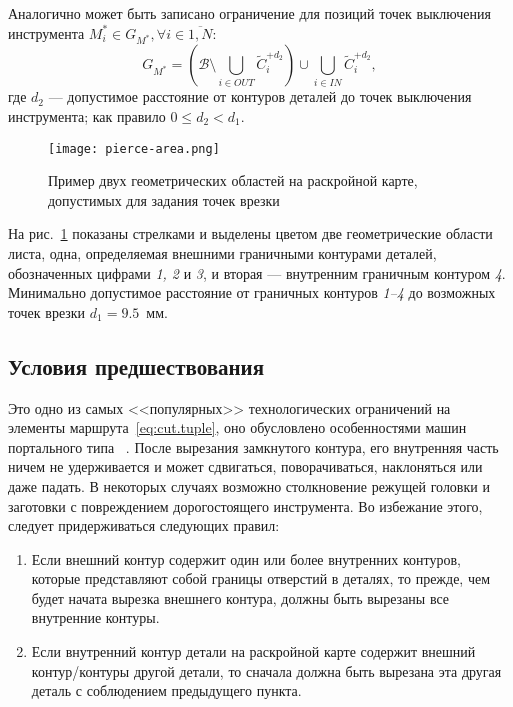 Аналогично может быть записано ограничение для
позиций точек выключения инструмента
$M^*_i \in G_{M^*}, \forall i \in \overline{1, N}$:
$$
G_{M^*} = \left(\mathcal B \setminus \bigcup_{i \in OUT} \widetilde C_i^{+d_2} \right)
  \cup \bigcup_{i \in IN} \widetilde C_i^{+d_2}
  ,
$$
где
$d_2$ --- допустимое расстояние
от контуров деталей до точек выключения инструмента;
как правило
$0 \leqslant d_2 < d_1$.

\begin{figure}
  \centering
  \texttt{[image: pierce-area.png]}
  \caption{
    Пример двух геометрических областей на раскройной карте,
    допустимых для задания точек врезки
  }
  \label{fig:cut.pierce-area}
\end{figure}

На рис.~\ref{fig:cut.pierce-area}
показаны стрелками и выделены цветом
две геометрические области листа,
одна, определяемая
внешними граничными контурами деталей,
обозначенных цифрами
\textit{1, 2} и \textit{3},
и вторая ---
внутренним граничным контуром
\textit{4}.
Минимально допустимое расстояние
от граничных контуров
\textit{1--4} до возможных точек врезки
$d_1=9.5$~мм.

\subsection{Условия предшествования}
\label{sec:cut.PC}

Это одно из самых <<популярных>>
технологических ограничений на элементы
маршрута~\eqref{eq:cut.tuple},
оно обусловлено особенностями машин портального типа
~\cite{bi:Petunin2,bi:dewil-review,bi:Dewil2015}.
После вырезания замкнутого контура,
его внутренняя часть ничем не удерживается и может сдвигаться,
поворачиваться, наклоняться или даже падать.
В некоторых случаях возможно столкновение
режущей головки и заготовки с повреждением дорогостоящего инструмента.
Во избежание этого, следует придерживаться следующих правил:
\begin{enumerate}
  \item
  Если внешний контур содержит один или более внутренних контуров,
  которые представляют собой границы отверстий в деталях,
  то прежде, чем будет начата вырезка внешнего контура,
  должны быть вырезаны все
  внутренние контуры.
  \item
  Если внутренний контур детали на раскройной карте содержит внешний контур/контуры другой детали,
  то сначала должна быть вырезана эта другая деталь с соблюдением предыдущего пункта.
\end{enumerate}

